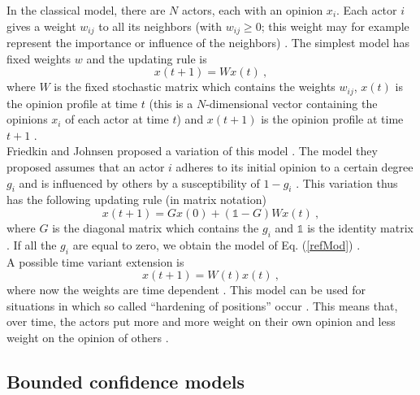 \documentclass[11 pt , letterpaper , twoside , openright]{book}
\begin{document}
In the classical model, there are $N$ actors, each with an opinion $x_i$. Each actor $i$ gives a weight $w_{ij}$ to all its neighbors (with $w_{ij} \geqslant 0$; this weight may for example represent the importance or influence of the neighbors) \cite{Krause2002}. The simplest model has fixed weights $w$ and the updating rule is
\begin{equation}\label{refMod}
	x(t+1) = W x(t) \ ,
\end{equation}
where $W$ is the fixed stochastic matrix which contains the weights $w_{ij}$, $x(t)$ is the opinion profile at time $t$ (this is a $N$-dimensional vector containing the opinions $x_i$ of each actor at time $t$) and $x(t+1)$ is the opinion profile at time $t+1$ \cite{Krause2002}.\\
\newline
Friedkin and Johnsen proposed a variation of this model \cite{Friedkin1990}\cite{Friedkin1999}. The model they proposed assumes that an actor $i$ adheres to its initial opinion to a certain degree $g_i$ and is influenced by others by a susceptibility of $1-g_i$ \cite{Krause2002}. This variation thus has the following updating rule (in matrix notation)
\begin{equation}
	x(t+1) = Gx(0) + (\mathbb{1}-G)Wx(t) \ ,
\end{equation}
where $G$ is the diagonal matrix which contains the $g_i$ and $\mathbb{1}$ is the identity matrix  \cite{Krause2002}. If all the $g_i$ are equal to zero, we obtain the model of Eq. (\ref{refMod}) \cite{Krause2002}.\\
\newline
A possible time variant extension is
\begin{equation}
	x(t+1) = W(t)x(t) \ ,
\end{equation}
where now the weights are time dependent \cite{Krause2002}. This model can be used for situations in which so called ``hardening of positions'' occur \cite{Krause2002}. This means that, over time, the actors put more and more weight on their own opinion and less weight on the opinion of others \cite{Krause2002}. 

\subsection{Bounded confidence models}\label{bounded}
\end{document}
